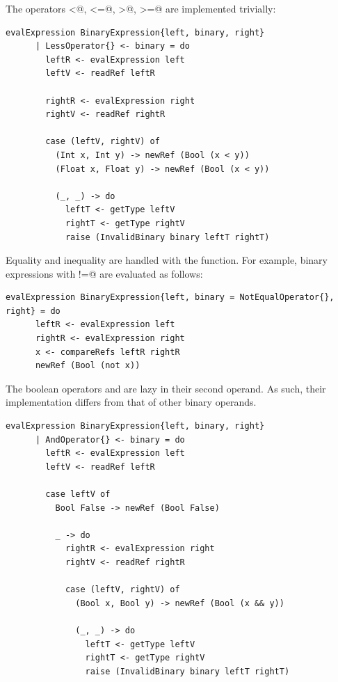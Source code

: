\documentclass[UdineBachThesis,american,11pt]{PhdThesis}
\begin{document}
  \newpage

  The operators \lstinline@<@, \lstinline@<=@, \lstinline@>@, \lstinline@>=@
  are implemented trivially:

  \begin{lstlisting}[gobble=4,basicstyle=\ttfamily\small]
    evalExpression BinaryExpression{left, binary, right}
      | LessOperator{} <- binary = do
        leftR <- evalExpression left
        leftV <- readRef leftR

        rightR <- evalExpression right
        rightV <- readRef rightR

        case (leftV, rightV) of
          (Int x, Int y) -> newRef (Bool (x < y))
          (Float x, Float y) -> newRef (Bool (x < y))

          (_, _) -> do
            leftT <- getType leftV
            rightT <- getType rightV
            raise (InvalidBinary binary leftT rightT)
  \end{lstlisting}

  Equality and inequality are handled with the \lstinline@compareRefs@ function.
  For example, binary expressions with \lstinline@!=@ are evaluated as follows:

  \begin{lstlisting}[gobble=4,basicstyle=\ttfamily\small]
    evalExpression BinaryExpression{left, binary = NotEqualOperator{}, right} = do
      leftR <- evalExpression left
      rightR <- evalExpression right
      x <- compareRefs leftR rightR
      newRef (Bool (not x))
  \end{lstlisting}

  The boolean operators \lstinline@and@ and \lstinline@or@ are lazy in their
  second operand. As such, their implementation differs from that of other
  binary operands.

  \begin{lstlisting}[gobble=4,basicstyle=\ttfamily\small]
    evalExpression BinaryExpression{left, binary, right}
      | AndOperator{} <- binary = do
        leftR <- evalExpression left
        leftV <- readRef leftR

        case leftV of
          Bool False -> newRef (Bool False)

          _ -> do
            rightR <- evalExpression right
            rightV <- readRef rightR

            case (leftV, rightV) of
              (Bool x, Bool y) -> newRef (Bool (x && y))

              (_, _) -> do
                leftT <- getType leftV
                rightT <- getType rightV
                raise (InvalidBinary binary leftT rightT)
  \end{lstlisting}
\end{document}
